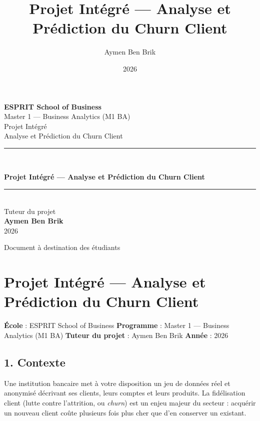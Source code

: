 \documentclass[11pt,a4paper]{article}
\title{\color{primary}\textbf{Projet Intégré --- Analyse et Prédiction
du Churn Client}}
\author{Aymen Ben Brik}
\date{2026}
\renewenvironment{quote}{\begin{quotebox}}{\end{quotebox}}
\begin{document}
\begin{titlepage}
\centering
\vspace*{1.5cm}

{\Large\bfseries ESPRIT School of Business}\\[0.3cm]
{\large Master 1 --- Business Analytics (M1 BA)}\\[2cm]

{\color{gray}\large Projet Intégré}\\[0.3cm]
{\color{gray}\large Analyse et Prédiction du Churn Client}\\[2.2cm]

\rule{0.85\linewidth}{1.2pt}\\[0.6cm]
{\Huge\bfseries\color{primary} Projet Intégré --- Analyse et Prédiction
du Churn Client\par}
\rule{0.85\linewidth}{1.2pt}\\[2cm]

{\large Tuteur du projet}\\[0.2cm]
{\Large\bfseries Aymen Ben Brik}\\[1cm]
{\large 2026}

\vfill
{\color{gray}\small Document à destination des étudiants}
\end{titlepage}

\tableofcontents
\newpage

\section{Projet Intégré --- Analyse et Prédiction du Churn
Client}\label{projet-intuxe9gruxe9-analyse-et-pruxe9diction-du-churn-client}

\begin{quote}
\textbf{École} : ESPRIT School of Business \textbf{Programme} : Master 1
--- Business Analytics (M1 BA) \textbf{Tuteur du projet} : Aymen Ben
Brik \textbf{Année} : 2026
\end{quote}

\subsection{1. Contexte}\label{contexte}

Une institution bancaire met à votre disposition un jeu de données réel
et anonymisé décrivant ses clients, leurs comptes et leurs produits. La
fidélisation client (lutte contre l'attrition, ou \emph{churn}) est un
enjeu majeur du secteur : acquérir un nouveau client coûte plusieurs
fois plus cher que d'en conserver un existant.
\end{document}
